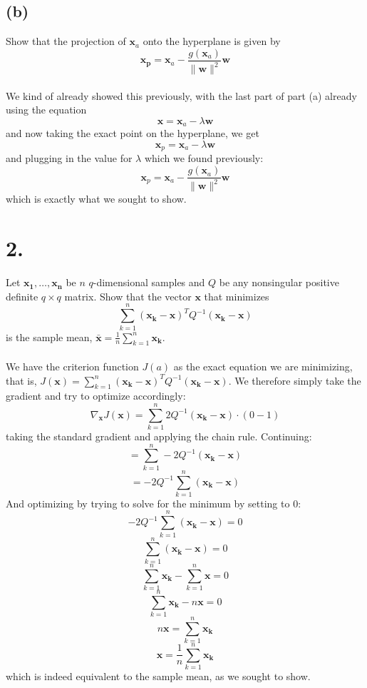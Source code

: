 \documentclass{article}
\begin{document}
{\subsection*{(b)}
Show that the projection of \(\mathbf{x}_a\) onto the hyperplane is given by 
\[
  \mathbf{x}_\mathbf{p} = \mathbf{x}_a - \frac{g(\mathbf{x}_a)}{\lVert \mathbf{w} \rVert^2} \mathbf{w}
\] \\
We kind of already showed this previously, with the last part of part (a) already using the equation 
\[
  \mathbf{x} = \mathbf{x}_a - \lambda \mathbf{w}
\]
and now taking the exact point on the hyperplane, we get 
\[
  \mathbf{x}_p = \mathbf{x}_a - \lambda \mathbf{w}
\]
and plugging in the value for \(\lambda\) which we found previously:
\[
  \mathbf{x}_p = \mathbf{x}_a - \frac{g(\mathbf{x}_a)}{\lVert \mathbf{w} \rVert^2} \mathbf{w}
\]
which is exactly what we sought to show. 

}
{\Large 

\section*{2.}
Let \(\mathbf{x_1}, \dots, \mathbf{x_n}\) be \(n\) \(q\)-dimensional samples and \(Q\) be any nonsingular positive definite \(q \times q\) matrix. Show that the vector \(\mathbf{x}\) that minimizes 
\[
  \sum_{k=1}^{n} (\mathbf{x_k} - \mathbf{x})^T Q^{-1} (\mathbf{x_k} - \mathbf{x})
\]
is the sample mean, \(\bar{\mathbf{x}} = \frac{1}{n} \sum_{k=1}^{n} \mathbf{x_k}\). \\ \\
We have the criterion function \(J(a)\) as the exact equation we are minimizing, that is, \(J(\mathbf{x}) = \sum_{k=1}^{n} (\mathbf{x_k} - \mathbf{x})^T Q^{-1} (\mathbf{x_k} - \mathbf{x})\). We therefore simply take the gradient and try to optimize accordingly:
\[
  \nabla_\mathbf{x} J(\mathbf{x}) = \sum_{k=1}^{n} 2 Q^{-1} (\mathbf{x_k} - \mathbf{x}) \cdot (0 - 1)
\]
taking the standard gradient and applying the chain rule. Continuing:
\[
  = \sum_{k=1}^{n} - 2 Q^{-1} (\mathbf{x_k} - \mathbf{x})
\]
\[
  = - 2 Q^{-1}  \sum_{k=1}^{n} (\mathbf{x_k} - \mathbf{x})
\]
And optimizing by trying to solve for the minimum by setting to 0:
\[
  - 2 Q^{-1}  \sum_{k=1}^{n} (\mathbf{x_k} - \mathbf{x}) = 0
\]
\[
  \sum_{k=1}^{n} (\mathbf{x_k} - \mathbf{x}) = 0
\]
\[
  \sum_{k=1}^{n} \mathbf{x_k} - \sum_{k=1}^{n} \mathbf{x} = 0
\]
\[
  \sum_{k=1}^{n} \mathbf{x_k} - n \mathbf{x} = 0
\]
\[
  n \mathbf{x} = \sum_{k=1}^{n} \mathbf{x_k}
\]
\[
  \mathbf{x} = \frac{1}{n} \sum_{k=1}^{n} \mathbf{x_k}
\]
which is indeed equivalent to the sample mean, as we sought to show. 

}
\end{document}
